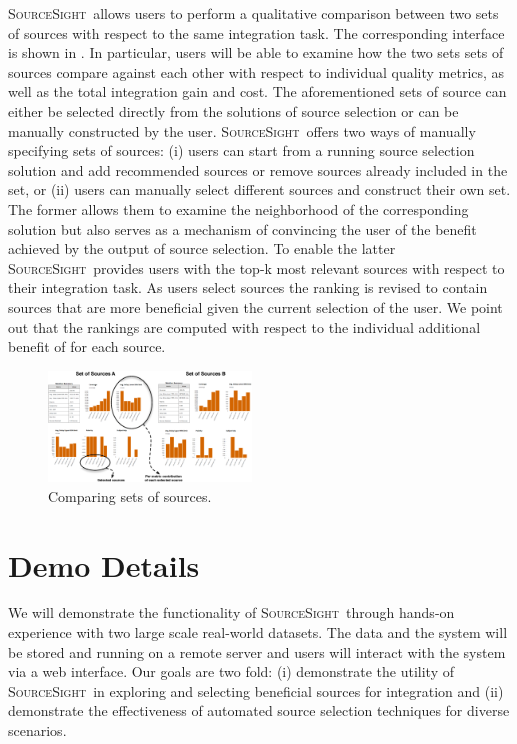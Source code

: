 \documentclass{vldb}
\newcommand\system{\textsc{SourceSight}}
\begin{document}
\system~allows users to perform a qualitative comparison between two sets of sources with respect to the same integration task. The corresponding interface is shown in . In particular, users will be able to examine how the two sets sets of sources compare against each other with respect to individual quality metrics, as well as the total integration gain and cost. The aforementioned sets of source can either be selected directly from the solutions of source selection or can be manually constructed by the user. \system~offers two ways of manually specifying sets of sources: (i) users can start from a running source selection solution and add recommended sources or remove sources already included in the set, or (ii) users can manually select different sources and construct their own set. The former allows them to examine the neighborhood of the corresponding solution but also serves as a mechanism of convincing the user of the benefit achieved by the output of source selection. To enable the latter \system~provides users with the top-k most relevant sources with respect to their integration task. As users select sources the ranking is revised to contain sources that are more beneficial given the current selection of the user. We point out that the rankings are computed with respect to the individual additional benefit of for each source. 
\begin{figure}
	\begin{center}
	\includegraphics[trim=0 0 0 0, clip,width=0.48\textwidth]{fig/compSS}
	\caption{Comparing sets of sources.}
	\label{fig:comparison}
	\end{center}
\end{figure}

\section{Demo Details}
We will demonstrate the functionality of \system~through hands-on experience with two large scale real-world datasets. The data and the system will be stored and running on a remote server and users will interact with the system via a web interface. Our goals are two fold: (i) demonstrate the utility of \system~in exploring and selecting beneficial sources for integration and (ii) demonstrate the effectiveness of automated source selection techniques for diverse scenarios. 
\end{document}
